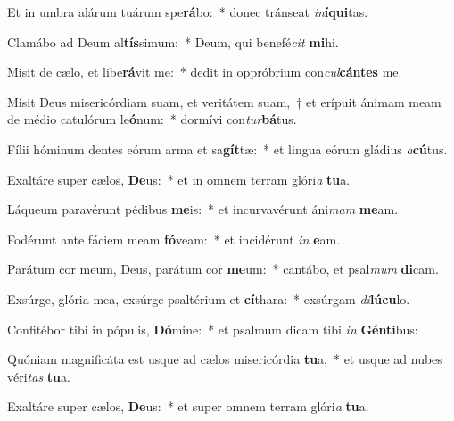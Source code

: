 \item Et in umbra alárum tuárum spe\textbf{rá}bo:~* donec tránseat \textit{in}\textbf{í}\textbf{qui}tas.
\item Clamábo ad Deum al\textbf{tís}simum:~* Deum, qui benefé\textit{cit} \textbf{mi}hi.
\item Misit de cælo, et libe\textbf{rá}vit me:~* dedit in oppróbrium con\textit{cul}\textbf{cán}\textbf{tes} me.
\item Misit Deus misericórdiam suam, et veritátem suam,~† et erípuit ánimam meam de médio catulórum le\textbf{ó}num:~* dormívi con\textit{tur}\textbf{bá}tus.
\item Fílii hóminum dentes eórum arma et sa\textbf{gít}tæ:~* et lingua eórum gládius \textit{a}\textbf{cú}tus.
\item Exaltáre super cælos, \textbf{De}us:~* et in omnem terram glóri\textit{a} \textbf{tu}a.
\item Láqueum paravérunt pédibus \textbf{me}is:~* et incurvavérunt áni\textit{mam} \textbf{me}am.
\item Fodérunt ante fáciem meam \textbf{fó}veam:~* et incidérunt \textit{in} \textbf{e}am.
\item Parátum cor meum, Deus, parátum cor \textbf{me}um:~* cantábo, et psal\textit{mum} \textbf{di}cam.
\item Exsúrge, glória mea, exsúrge psaltérium et \textbf{cí}thara:~* exsúrgam \textit{di}\textbf{lú}\textbf{cu}lo.
\item Confitébor tibi in pópulis, \textbf{Dó}mine:~* et psalmum dicam tibi \textit{in} \textbf{Gén}\textbf{ti}bus:
\item Quóniam magnificáta est usque ad cælos misericórdia \textbf{tu}a,~* et usque ad nubes véri\textit{tas} \textbf{tu}a.
\item Exaltáre super cælos, \textbf{De}us:~* et super omnem terram glóri\textit{a} \textbf{tu}a.

